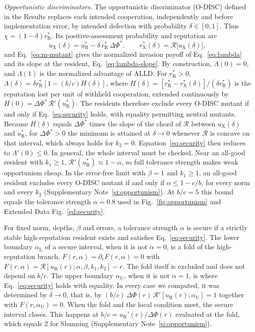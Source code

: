 \documentclass[fleqn,10pt]{wlscirep}
\newcommand{\Rmap}{\mathscr{R}}            %
\newcommand{\rR}{r_{\mathrm{R}}^{*}}
\newcommand{\uR}{u_{\mathrm{R}}^{*}}
\newcommand{\rX}{r_{\mathrm{X}}^{*}}
\newcommand{\uX}{u_{\mathrm{X}}}
\newcommand{\dPhi}{\Delta\Phi^{*}}
\theoremstyle{plain}
\begin{document}
\textit{Opportunistic discriminators.} The opportunistic discriminator (O-DISC) defined in the Results replaces each intended cooperation, independently and before implementation error, by intended defection with probability $\delta\in[0,1]$. Thus $\chi=(1-\delta)\rR$. Its positive-assessment probability and reputation are
\begin{equation}
\uX(\delta)=\uR-\delta\,\rR\,\dPhi,\qquad \rX(\delta)=\Rmap\bigl[\uX(\delta)\bigr],
\label{eq:m-odisc}
\end{equation}
and Eq.~\eqref{eq:m-mutant} gives the normalized invasion payoff of Eq.~\eqref{eq:lambda} and its slope at the resident, Eq.~\eqref{eq:lambda-slope}. By construction, $\Lambda(0)=0$, and $\Lambda(1)$ is the normalized advantage of ALLD. For $\rR>0$, $\Lambda(\delta)=\delta\rR[1-(b/c)H(\delta)]$, where $H(\delta)=[\rR-\rX(\delta)]/(\delta\rR)$ is the reputation lost per unit of withheld cooperation, extended continuously by $H(0)=\dPhi\,\Rmap'(\uR)$. The residents therefore exclude every O-DISC mutant if and only if Eq.~\eqref{eq:security} holds, with equality permitting neutral mutants. Because $H(\delta)$ equals $\dPhi$ times the slope of the chord of $\Rmap$ between $\uX(\delta)$ and $\uR$, for $\dPhi>0$ the minimum is attained at $\delta\to0$ whenever $\Rmap$ is concave on that interval, which always holds for $k_2=0$. Equation~\eqref{eq:security} then reduces to $\Lambda'(0)\leq0$. In general, the whole interval must be checked. Near an all-good resident with $k_1\geq1$, $\Rmap'(\uR)\approx1-\alpha$, so full tolerance strength makes weak opportunism cheap. In the error-free limit with $\beta=1$ and $k_1\geq1$, an all-good resident excludes every O-DISC mutant if and only if $\alpha\leq1-c/b$, for every norm and every $k_2$ (Supplementary Note~\ref{si:opportunism}). At $b/c=5$ this bound equals the tolerance strength $\alpha=0.8$ used in Fig.~\ref{fig:opportunism} and Extended Data Fig.~\ref{ed:security}.

For fixed norm, depths, $\beta$ and errors, a tolerance strength $\alpha$ is secure if a strictly stable high-reputation resident exists and satisfies Eq.~\eqref{eq:security}. The lower boundary $\alpha_{\mathrm L}$ of a secure interval, when it is not $\alpha=0$, is a fold of the high-reputation branch, $F(r,\alpha)=\partial_rF(r,\alpha)=0$ with $F(r,\alpha)=\Rmap[u_{\mathrm R}(r);\alpha,\beta,k_1,k_2]-r$. The fold itself is excluded and does not depend on $b/c$. The upper boundary $\alpha_{\mathrm U}$, when it is not $\alpha=1$, is where Eq.~\eqref{eq:security} holds with equality. In every case we computed, it was determined by $\delta\to0$, that is, by $(b/c)\,\Delta\Phi(r)\,\Rmap'[u_{\mathrm R}(r);\alpha_{\mathrm U}]=1$ together with $F(r,\alpha_{\mathrm U})=0$. When the fold and the local condition meet, the secure interval closes. This happens at $b/c=u_{\mathrm R}'(r)/\Delta\Phi(r)$ evaluated at the fold, which equals 2 for Shunning (Supplementary Note~\ref{si:opportunism}).
\end{document}
